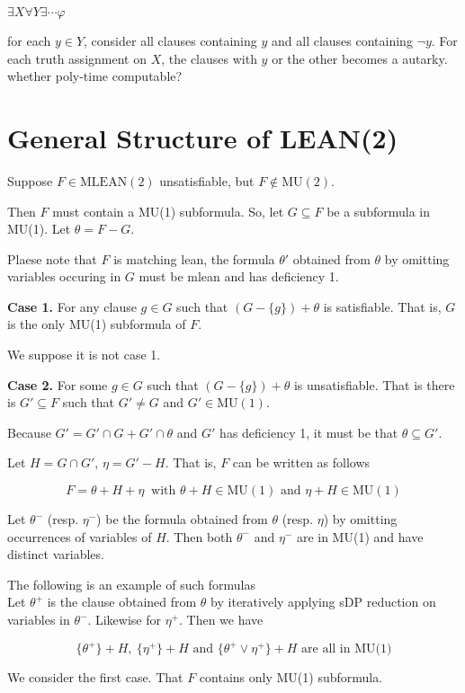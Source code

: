 \documentclass[12pt]{article}
\begin{document}

$\exists X\forall Y\exists \cdots \varphi$ 

for each $y\in Y$, consider all clauses containing $y$ and all clauses containing $\neg y$. For each truth assignment on $X$, the clauses with $y$ or the other becomes a autarky. whether poly-time computable?   


\section{General Structure of LEAN(2)}

Suppose $F\in\text{MLEAN}(2)$ unsatisfiable, but $F\not\in \text{MU}(2)$. 

Then $F$ must contain a MU(1) subformula. So, let $G\subseteq F$ be a subformula in MU(1). Let $\theta=F-G$. 

Plaese note that $F$ is matching lean, the formula $\theta'$ obtained from $\theta$ by omitting variables occuring in $G$ must be mlean and has deficiency 1.  

{\bf Case 1.} For any clause $g\in G$  such that $(G-\{g\})+\theta$ is satisfiable. That is, $G$ is the only MU(1) subformula of $F$. 

We suppose it is not case 1. 

   
{\bf Case 2.} For some $g\in G$ such that $(G-\{g\})+\theta$ is unsatisfiable.
That is there is $G'\subseteq F$ such that $G'\not=G$ and $G'\in \text{MU}(1)$. 

Because $G'=G'\cap G+G'\cap \theta$ and $G'$ has deficiency 1, it must be that $\theta\subseteq G'$. 

Let $H=G\cap G'$, $\eta =G'-H$. That is, $F$ can be written as follows

$$F=\theta+H+\eta\ \text{ with }\theta+H\in \text{MU}(1) \text{ and } \eta+H \in \text{MU}(1)$$ 

Let $\theta^-$ (resp. $\eta^-$) be the formula obtained from $\theta$ (resp. $\eta$) by omitting occurrences of variables of $H$. Then both $\theta^-$ and $\eta^-$ are in MU(1) and have distinct variables. 

The following is an example of such formulas \\


Let $\theta^+$ is the clause obtained from $\theta$ by iteratively applying sDP reduction on variables in $\theta^-$. Likewise for $\eta^+$. Then we have 

$$\{\theta^+\}+H,\ \{\eta^+\}+H \text{ and } \{\theta^+\vee \eta^+\}+H \text{ are all in MU(1)}$$ 


We consider the first case. That $F$ contains only MU(1) subformula.
\end{document}
